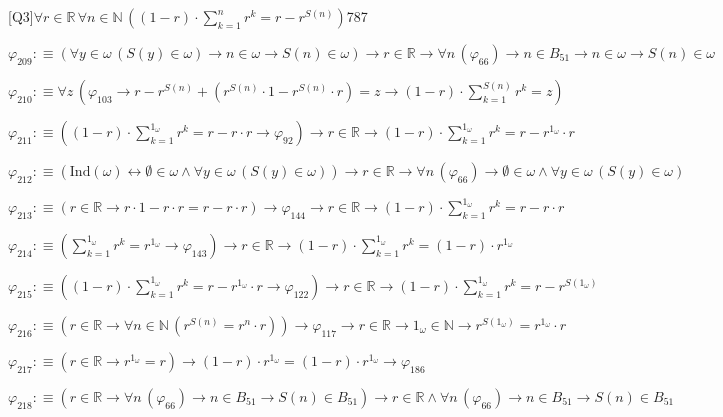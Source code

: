 \begin{fullproof}{[Q3]}{$\forall r \in \mathbb{R}\,\forall n \in \mathbb{N}\,((1 - r) \cdot {\textstyle\sum_{k=1}^{n} {{r}^{k}}} = r - {{r}^{S(n)}})$}{787}
\begin{abbrevlist}
\item $\varphi_{209} :\equiv (\forall y \in \omega\,(S(y) \in \omega) \to n \in \omega \to S(n) \in \omega) \to r \in \mathbb{R} \to \forall n\,(\varphi_{66}) \to n \in B_{51} \to n \in \omega \to S(n) \in \omega$
\item $\varphi_{210} :\equiv \forall z\,(\varphi_{103} \to r - {{r}^{S(n)}} + ({{r}^{S(n)}} \cdot 1 - {{r}^{S(n)}} \cdot r) = z \to (1 - r) \cdot {\textstyle\sum_{k=1}^{S(n)} {{r}^{k}}} = z)$
\item $\varphi_{211} :\equiv ((1 - r) \cdot {\textstyle\sum_{k=1}^{1_{\omega}} {{r}^{k}}} = r - r \cdot r \to \varphi_{92}) \to r \in \mathbb{R} \to (1 - r) \cdot {\textstyle\sum_{k=1}^{1_{\omega}} {{r}^{k}}} = r - {{r}^{1_{\omega}}} \cdot r$
\item $\varphi_{212} :\equiv (\mathrm{Ind}(\omega) \leftrightarrow \emptyset \in \omega \land \forall y \in \omega\,(S(y) \in \omega)) \to r \in \mathbb{R} \to \forall n\,(\varphi_{66}) \to \emptyset \in \omega \land \forall y \in \omega\,(S(y) \in \omega)$
\item $\varphi_{213} :\equiv (r \in \mathbb{R} \to r \cdot 1 - r \cdot r = r - r \cdot r) \to \varphi_{144} \to r \in \mathbb{R} \to (1 - r) \cdot {\textstyle\sum_{k=1}^{1_{\omega}} {{r}^{k}}} = r - r \cdot r$
\item $\varphi_{214} :\equiv ({\textstyle\sum_{k=1}^{1_{\omega}} {{r}^{k}}} = {{r}^{1_{\omega}}} \to \varphi_{143}) \to r \in \mathbb{R} \to (1 - r) \cdot {\textstyle\sum_{k=1}^{1_{\omega}} {{r}^{k}}} = (1 - r) \cdot {{r}^{1_{\omega}}}$
\item $\varphi_{215} :\equiv ((1 - r) \cdot {\textstyle\sum_{k=1}^{1_{\omega}} {{r}^{k}}} = r - {{r}^{1_{\omega}}} \cdot r \to \varphi_{122}) \to r \in \mathbb{R} \to (1 - r) \cdot {\textstyle\sum_{k=1}^{1_{\omega}} {{r}^{k}}} = r - {{r}^{S(1_{\omega})}}$
\item $\varphi_{216} :\equiv (r \in \mathbb{R} \to \forall n \in \mathbb{N}\,({{r}^{S(n)}} = {{r}^{n}} \cdot r)) \to \varphi_{117} \to r \in \mathbb{R} \to 1_{\omega} \in \mathbb{N} \to {{r}^{S(1_{\omega})}} = {{r}^{1_{\omega}}} \cdot r$
\item $\varphi_{217} :\equiv (r \in \mathbb{R} \to {{r}^{1_{\omega}}} = r) \to (1 - r) \cdot {{r}^{1_{\omega}}} = (1 - r) \cdot {{r}^{1_{\omega}}} \to \varphi_{186}$
\item $\varphi_{218} :\equiv (r \in \mathbb{R} \to \forall n\,(\varphi_{66}) \to n \in B_{51} \to S(n) \in B_{51}) \to r \in \mathbb{R} \land \forall n\,(\varphi_{66}) \to n \in B_{51} \to S(n) \in B_{51}$

\end{abbrevlist}
\end{fullproof}
